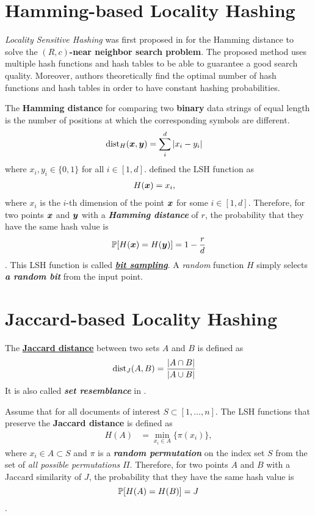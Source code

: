 \documentclass[11pt]{article}
\begin{document}
\section{Hamming-based Locality Hashing}
\emph{Locality Sensitive Hashing} was first proposed in \citep{indyk1998approximate} for the Hamming distance to solve the \textbf{$(R, c)$-near neighbor search problem}. The proposed method uses multiple hash functions and hash tables to be able to guarantee a good search quality. Moreover, authors theoretically find the optimal number of hash functions and hash tables in order to have constant hashing probabilities.

The \textbf{Hamming distance} for comparing two \textbf{binary} data strings of equal length is the number of positions at which the corresponding symbols are different.
\begin{align*}
\text{dist}_{H}(\boldsymbol{x}, \boldsymbol{y}) &= \sum_{i}^{d}\left\lvert x_i - y_i \right\rvert
\end{align*} where $x_i, y_i \in \{0, 1\}$ for all $i \in [1,d]$. \citep{indyk1998approximate} defined the LSH function as
\begin{align}
H(\boldsymbol{x}) &= x_i,  \label{eqn: lsh_hamming}
\end{align} where $x_i$ is the $i$-th dimension of the point $\boldsymbol{x}$ for some $i \in [1, d]$. Therefore, for two points $\boldsymbol{x}$ and $\boldsymbol{y}$ with a \emph{\textbf{Hamming distance}} of $r$, the probability that they have the same hash value is $${\mathbb P}[H(\boldsymbol{x}) = H(\boldsymbol{y})] = 1 - \frac{r}{d}$$. This LSH function is called \underline{\emph{\textbf{bit sampling}}}. A \emph{random} function $H$ simply selects \emph{\textbf{a random bit}} from the input point. 

\section{Jaccard-based Locality Hashing}
The  \underline{\textbf{Jaccard distance}} between two sets $A$ and $B$ is defined as
\begin{align}
\text{dist}_{J}(A, B) &= \frac{\left\lvert A \cap B \right\rvert}{\left\lvert A \cup B \right\rvert}  \label{eqn: jaccard_dist}
\end{align} It is also called \emph{\textbf{set resemblance}} in \citep{indyk1998approximate, broder2000min}.

Assume that for all documents of interest $S \subset [1, \ldots, n]$. The LSH functions that preserve the \textbf{Jaccard distance} \citep{broder2000min} is defined as 
\begin{align}
H(A) &= \min_{x_i  \in A}\{\pi(x_i)\},  \label{eqn: lsh_jaccard}
\end{align} where $x_i \in A \subset S$ and $\pi$ is a \emph{\textbf{random permutation}} on the index set $S$ from the set of \emph{all possible permutations} $\Pi$. Therefore, for two points $A$ and $B$ with a Jaccard similarity of $J$, the probability that they have the same hash value is $${\mathbb P}[H(A) = H(B)] = J$$.
\end{document}
